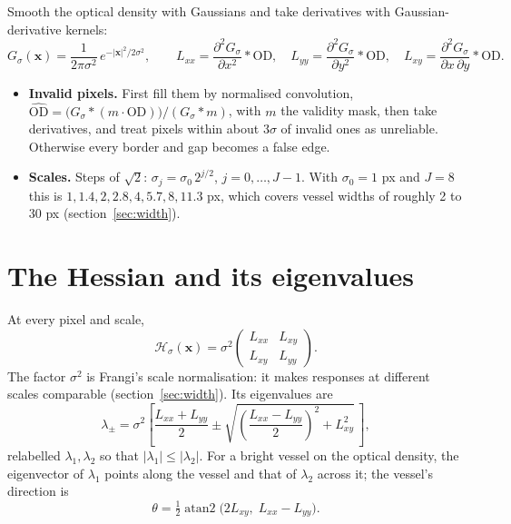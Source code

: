 \documentclass[11pt]{article}
\newcommand{\x}{\mathbf{x}}
\newcommand{\OD}{\mathrm{OD}}
\begin{document}
Smooth the optical density with Gaussians and take derivatives with Gaussian-derivative kernels:
\begin{equation}
  G_\sigma(\x) = \frac{1}{2\pi\sigma^2}\, e^{-|\x|^2 / 2\sigma^2},
  \qquad
  L_{xx} = \frac{\partial^2 G_\sigma}{\partial x^2} * \OD,
  \quad
  L_{yy} = \frac{\partial^2 G_\sigma}{\partial y^2} * \OD,
  \quad
  L_{xy} = \frac{\partial^2 G_\sigma}{\partial x\, \partial y} * \OD.
\end{equation}
\begin{itemize}
  \item \textbf{Invalid pixels.} First fill them by normalised convolution,
        $\widehat{\OD} = \bigl(G_\sigma * (m \cdot \OD)\bigr) / (G_\sigma * m)$, with $m$ the validity mask, then take derivatives, and treat
        pixels within about $3\sigma$ of invalid ones as unreliable. Otherwise every border and gap becomes a false
        edge.
  \item \textbf{Scales.} Steps of $\sqrt 2$: $\sigma_j = \sigma_0\, 2^{j/2}$, $j = 0, \dots, J - 1$. With
        $\sigma_0 = 1$ px and $J = 8$ this is $1, 1.4, 2, 2.8, 4, 5.7, 8, 11.3$ px, which covers vessel widths of
        roughly 2 to 30 px (section~\ref{sec:width}).
\end{itemize}

\section{The Hessian and its eigenvalues}\label{sec:hessian}

At every pixel and scale,
\begin{equation}
  \mathcal H_\sigma(\x) = \sigma^2
  \begin{pmatrix} L_{xx} & L_{xy} \\ L_{xy} & L_{yy} \end{pmatrix}.
\end{equation}
The factor $\sigma^2$ is Frangi's scale normalisation: it makes responses at different scales comparable
(section~\ref{sec:width}). Its eigenvalues are
\begin{equation}
  \lambda_{\pm} = \sigma^2 \left[ \frac{L_{xx} + L_{yy}}{2} \pm
  \sqrt{\left(\frac{L_{xx} - L_{yy}}{2}\right)^2 + L_{xy}^2}\, \right],
\end{equation}
relabelled $\lambda_1, \lambda_2$ so that $|\lambda_1| \le |\lambda_2|$. For a bright vessel on the optical density,
the eigenvector of $\lambda_1$ points along the vessel and that of $\lambda_2$ across it; the vessel's direction is
\begin{equation}
  \theta = \tfrac12 \operatorname{atan2}\bigl(2L_{xy},\; L_{xx} - L_{yy}\bigr).
\end{equation}
\end{document}
